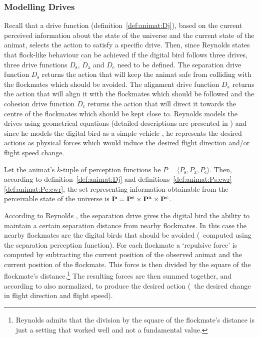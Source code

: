 \subsubsection{Modelling Drives}
Recall that a drive function (definition~\ref{def:animat:Dj}), based on the current perceived information about the state of the universe and the current state of the animat, selects the action to satisfy a specific drive. Then, since Reynolds states that flock-like behaviour can be achieved if the digital bird follows three drives, three drive functions $D_\mathrm{s}$, $D_\mathrm{a}$ and $D_\mathrm{c}$ need to be defined. The separation drive function $D_\mathrm{s}$ returns the action that will keep the animat safe from colliding with the flockmates which should be avoided. The alignment drive function $D_\mathrm{a}$ returns the action that will align it with the flockmates which should be followed and the cohesion drive function $D_\mathrm{c}$ returns the action that will direct it towards the centre of the flockmates which should be kept close to. Reynolds models the drives using geometrical equations (detailed descriptions are presented in \cite{reynolds:1999}) and since he models the digital bird as a simple vehicle \cite{reynolds:1987,reynolds:1999}, he represents the desired actions as physical forces which would induce the desired flight direction and/or flight speed change.  

Let the animat's $k$-tuple of perception functions be  $P=\langle P_\mathrm{s},P_\mathrm{a},P_\mathrm{c}\rangle$. Then, according to definition~\ref{def:animat:Dj} and definitions~\ref{def:animat:Ps:cwr}--\ref{def:animat:Pc:cwr}, the set representing information obtainable from the perceivable state of the universe is ${\mathbf{P}}={\mathbf{P}}^\mathrm{s} \times {\ensuremath{\mathbf{P}}}^\mathrm{a} \times {\ensuremath{\mathbf{P}}}^\mathrm{c}$. 

According to Reynolds \cite{reynolds:1999}, the separation drive gives the digital bird the ability to maintain a certain separation distance from nearby flockmates. In this case the nearby flockmates are the digital birds that should be avoided (\ie\ computed using the separation perception function). For each flockmate a `repulsive force' is computed by subtracting the current position of the observed animat and the current position of the flockmate. This force is then divided by the square of the flockmate's distance.\footnote{Reynolds admits \cite{reynolds:1999} that the division by the square of the flockmate's distance is just a setting that worked well and not a fundamental value.} The resulting forces are then summed together, and according to  also normalized, to produce the desired action (\ie\ the desired change in flight direction and flight speed). 

